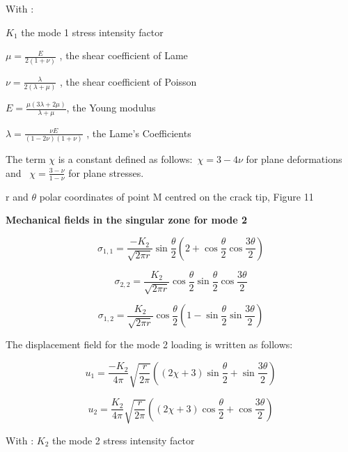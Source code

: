 With : 

$K_1$  the mode 1 stress intensity factor

$\mu=\frac{E}{2 (1+\nu)}$ , the shear coefficient of Lame

$\nu=\frac{\lambda}{2 (\lambda+\mu)}$ , the shear coefficient of Poisson

$E=\frac{\mu (3 \lambda+2 \mu)}{\lambda+\mu}$, the Young modulus

$\lambda=\frac{\nu E}{(1-2 \nu)(1+\nu)}$ , the Lame’s Coefficients

The term $\chi$ is a constant defined as follows:\ $\chi=3-4\nu$ for plane deformations and \ $\chi=\frac{3-\nu}{1-\nu}$  for plane stresses.

r and $\theta$ polar coordinates of point M centred on the crack tip, Figure 11

\smallskip

\textbf{Mechanical fields in the singular zone for mode 2}

\begin{equation}
	\sigma_{1,1} = \frac{-K_{2}}{\sqrt{2 \pi r}} \sin{\frac{\theta}{2}}  \left( 2+\cos{\frac{\theta}{2}} \cos{\frac{3 \theta}{2}} \right)
\end{equation}

\begin{equation}
	\sigma_{2,2} = \frac{K_{2}}{\sqrt{2 \pi r}} \cos{\frac{\theta}{2}}  \sin{\frac{\theta}{2}} \cos{\frac{3 \theta}{2}}
\end{equation}

\begin{equation}
	\sigma_{1,2} = \frac{K_{2}}{\sqrt{2 \pi r}} \cos{\frac{\theta}{2}}  \left( 1-\sin{\frac{\theta}{2}} \sin{\frac{3 \theta}{2}} \right)
\end{equation}

The displacement field for the mode 2 loading is written as follows:

\begin{equation}
	u_{1} = \frac{-K_{2}}{4 \pi} \sqrt{\frac{r}{2 \pi}} \left((2 \chi+3) \sin{\frac{\theta}{2}}+\sin{\frac{3 \theta}{2}}\right)
\end{equation}

\begin{equation}
	u_{2} = \frac{K_{2}}{4 \pi} \sqrt{\frac{r}{2 \pi}} \left((2 \chi+3) \cos{\frac{\theta}{2}}+\cos{\frac{3 \theta}{2}}\right)
\end{equation}

With : $K_2$  the mode 2 stress intensity factor

